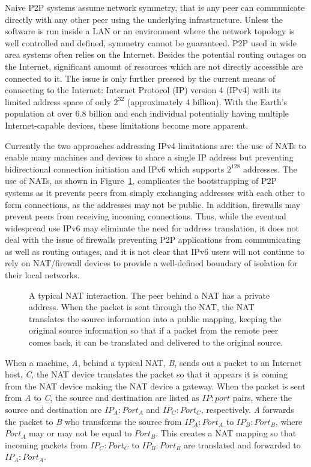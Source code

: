 Naive P2P systems assume network symmetry, that is any peer can communicate
directly with any other peer using the underlying infrastructure.  Unless the
software is run inside a LAN or an environment where the network topology is
well controlled and defined, symmetry cannot be guaranteed.  P2P used in wide
area systems often relies on the Internet.  Besides the potential routing
outages on the Internet, significant amount of resources which are not directly
accessible are connected to it.  The issue is only further pressed by the
current means of connecting to the Internet: Internet Protocol (IP) version 4
(IPv4) with its limited address space of only $2^{32}$ (approximately 4
billion).  With the Earth's population at over 6.8 billion and each individual
potentially having multiple Internet-capable devices, these limitations become
more apparent.

Currently the two approaches addressing IPv4 limitations are:  the use of
NATs to enable many machines and devices to share a single IP address but
preventing bidirectional connection initiation and IPv6 which supports
$2^{128}$ addresses.  The use of NATs, as shown in Figure~\ref{fig:nat},
complicates the bootstrapping of P2P systems as it prevents peers from simply
exchanging addresses with each other to form connections, as the addresses may
not be public.  In addition, firewalls may prevent peers from receiving
incoming connections.  Thus, while the eventual widespread use IPv6 may
eliminate the need for address translation, it does not deal with the issue of
firewalls preventing P2P applications from communicating as well as routing
outages, and it is not clear that IPv6 users will not continue to rely on
NAT/firewall devices to provide a well-defined boundary of isolation for their
local networks.

\begin{figure}
\centering
{}
\caption[A typical NAT interaction]{A typical NAT interaction. The peer behind
a NAT has a private address.  When the packet is sent through the NAT, the NAT
translates the source information into a public mapping, keeping the original
source information so that if a packet from the remote peer comes back, it can
be translated and delivered to the original source.}
\label{fig:nat}
\end{figure}

When a machine, \textit{A}, behind a typical NAT, \textit{B}, sends out a
packet to an Internet host, \textit{C}, the NAT device translates the packet so
that it appears it is coming from the NAT device making the NAT device a
gateway.  When the packet is sent from \textit{A} to \textit{C}, the source and
destination are listed as $IP:port$ pairs, where the source and destination are
$IP_A:Port_A$ and $IP_C:Port_C$, respectively.  \textit{A} forwards the packet
to \textit{B} who transforms the source from $IP_A:Port_A$ to $IP_B:Port_B$,
where $Port_A$ may or may not be equal to $Port_B$.  This creates a NAT mapping
so that incoming packets from $IP_C:Port_C$ to $IP_B:Port_B$ are translated and
forwarded to $IP_A:Port_A$.

